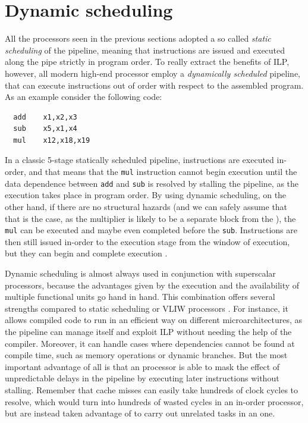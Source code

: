 \section{Dynamic scheduling}
All the processors seen in the previous sections adopted a so called \emph{static scheduling} of the pipeline, meaning that instructions are issued and executed along the pipe strictly in program order. To really extract the benefits of \ac{ILP}, however, all modern high-end processor employ a \emph{dynamically scheduled} pipeline, that can execute instructions out of order with respect to the assembled program. As an example consider the following code:
\begin{verbatim}
  add    x1,x2,x3
  sub    x5,x1,x4
  mul    x12,x18,x19
\end{verbatim}
In a classic 5-stage statically scheduled pipeline, instructions are executed in-order, and that means that the \texttt{mul} instruction cannot begin execution until the data dependence between \texttt{add} and \texttt{sub} is resolved by stalling the pipeline, as the execution takes place in program order. By using dynamic scheduling, on the other hand, if there are no structural hazards (and we can safely assume that that is the case, as the multiplier is likely to be a separate block from the ), the \texttt{mul} can be executed and maybe even completed before the \texttt{sub}. Instructions are then still issued in-order to the execution stage from the window of execution, but they can begin and complete execution \ooo.

Dynamic scheduling is almost always used in conjunction with superscalar processors, because the advantages given by the \ooo execution and the availability of multiple functional units go hand in hand. This combination offers several strengths compared to static scheduling or \ac{VLIW} processors \cite[p.~192]{hennessy17}. For instance, it allows compiled code to run in an efficient way on different microarchitectures, as the pipeline can manage itself and exploit \ac{ILP} without needing the help of the compiler. Moreover, it can handle cases where dependencies cannot be found at compile time, such as memory operations or dynamic branches. But the most important advantage of all is that an \ooo processor is able to mask the effect of unpredictable delays in the pipeline by executing later instructions without stalling. Remember that cache misses can easily take hundreds of clock cycles to resolve, which would turn into hundreds of wasted cycles in an in-order processor, but are instead taken advantage of to carry out unrelated tasks in an \ooo one.

